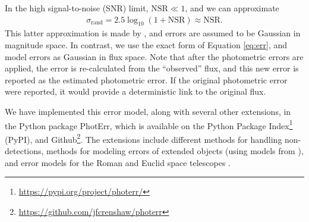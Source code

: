 \documentclass[twocolumn,twocolappendix]{aastex631}
\begin{document}
In the high signal-to-noise (SNR) limit, $\text{NSR} \ll 1$, and we can approximate
\begin{align}
    \sigma_\text{rand} = 2.5 \log_{10}(1 + \text{NSR}) \approx \text{NSR}.
    \label{eq:err}
\end{align}
This latter approximation is made by \citet{ivezic2019}, and errors are assumed to be Gaussian in magnitude space.
In contrast, we use the exact form of Equation \ref{eq:err}, and model errors as Gaussian in flux space.
Note that after the photometric errors are applied, the error is re-calculated from the ``observed'' flux, and this new error is reported as the estimated photometric error.
If the original photometric error were reported, it would provide a deterministic link to the original flux.

We have implemented this error model, along with several other extensions, in the Python package PhotErr, which is available on the Python Package Index\footnote{\url{https://pypi.org/project/photerr/}} (PyPI), and Github\footnote{\url{https://github.com/jfcrenshaw/photerr}}.
The extensions include different methods for handling non-detections, methods for modeling errors of extended objects (using models from \citealt{vandenbusch2020,kuijken2019}), and error models for the Roman and Euclid space telescopes \citep{roman,euclid,graham2020}.




\end{document}
